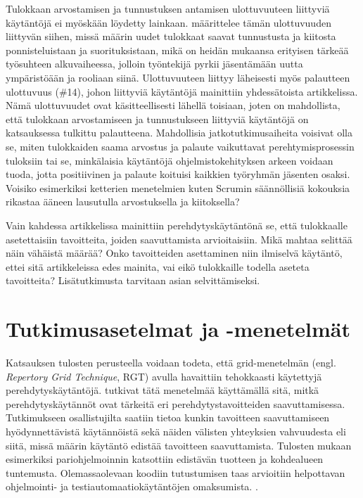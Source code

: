 \documentclass[utf8]{gradu3}
\begin{document}
Tulokkaan arvostamisen ja tunnustuksen antamisen ulottuvuuteen liittyviä käytäntöjä ei myöskään löydetty lainkaan. \textcite{wanberg-2012} määrittelee tämän ulottuvuuden liittyvän siihen, missä määrin uudet tulokkaat saavat tunnustusta ja kiitosta ponnisteluistaan ja suorituksistaan, mikä on heidän mukaansa erityisen tärkeää työsuhteen alkuvaiheessa, jolloin työntekijä pyrkii jäsentämään uutta ympäristöään ja rooliaan siinä. Ulottuvuuteen liittyy läheisesti myös palautteen ulottuvuus (\#14), johon liittyviä käytäntöjä mainittiin yhdessätoista artikkelissa. Nämä ulottuvuudet ovat käsitteellisesti lähellä toisiaan, joten on mahdollista, että tulokkaan arvostamiseen ja tunnustukseen liittyviä käytäntöjä on katsauksessa tulkittu palautteena. Mahdollisia jatkotutkimusaiheita voisivat olla se, miten tulokkaiden saama arvostus ja palaute vaikuttavat perehtymisprosessin tuloksiin tai se, minkälaisia käytäntöjä ohjelmistokehityksen arkeen voidaan tuoda, jotta positiivinen ja palaute koituisi kaikkien työryhmän jäsenten osaksi. Voisiko esimerkiksi ketterien menetelmien kuten Scrumin säännöllisiä kokouksia rikastaa ääneen lausutulla arvostuksella ja kiitoksella?

Vain kahdessa artikkelissa mainittiin perehdytyskäytäntönä se, että tulokkaalle asetettaisiin tavoitteita, joiden saavuttamista arvioitaisiin. Mikä mahtaa selittää näin vähäistä määrää? Onko tavoitteiden asettaminen niin ilmiselvä käytäntö, ettei sitä artikkeleissa edes mainita, vai eikö tulokkaille todella aseteta tavoitteita? Lisätutkimusta tarvitaan asian selvittämiseksi.




\section{Tutkimusasetelmat ja -menetelmät}

Katsauksen tulosten perusteella voidaan todeta, että grid-menetelmän (engl. \textit{Repertory Grid Technique}, RGT) avulla havaittiin tehokkaasti käytettyjä perehdytyskäytäntöjä. \textcite{buchan-ym-2019} tutkivat tätä menetelmää käyttämällä sitä, mitkä perehdytyskäytännöt ovat tärkeitä eri perehdytystavoitteiden saavuttamisessa. Tutkimukseen osallistujilta saatiin tietoa kunkin tavoitteen saavuttamiseen hyödynnettävistä käytännöistä sekä näiden välisten yhteyksien vahvuudesta eli siitä, missä määrin käytäntö edistää tavoitteen saavuttamista. Tulosten mukaan esimerkiksi pariohjelmoinnin katsottiin edistävän tuotteen ja kohdealueen tuntemusta. Olemassaolevaan koodiin tutustumisen taas arvioitiin helpottavan ohjelmointi- ja testiautomaatiokäytäntöjen omaksumista. \parencite{buchan-ym-2019}.
\end{document}
